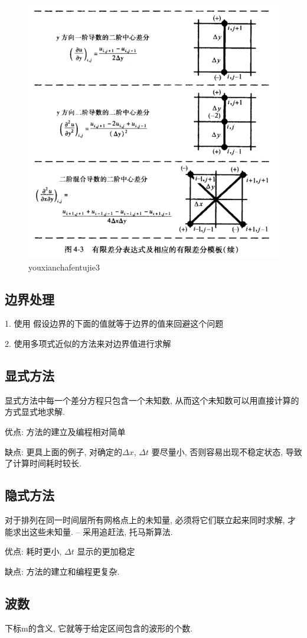 \begin{figure}
	\centering
	\includegraphics[width=0.7\linewidth]{figures/youxianchafentujie3.png}
	\caption{youxianchafentujie3}
	\label{fig:youxianchafentujie3}
\end{figure}


\subsection{边界处理}
1. 使用 假设边界的下面的值就等于边界的值来回避这个问题

2. 使用多项式近似的方法来对边界值进行求解

\subsection{显式方法}
显式方法中每一个差分方程只包含一个未知数, 从而这个未知数可以用直接计算的方式显式地求解.

优点: 方法的建立及编程相对简单

缺点: 更具上面的例子, 对确定的$\Delta  x$,  $\Delta t$ 要尽量小, 否则容易出现不稳定状态, 导致了计算时间耗时较长.
\subsection{隐式方法}
对于排列在同一时间层所有网格点上的未知量, 必须将它们联立起来同时求解, 才能求出这些未知量. -- 采用追赶法, 托马斯算法.

优点: 耗时更小, $\Delta t$ 显示的更加稳定

缺点: 方法的建立和编程更复杂.

\subsection{波数}
下标m的含义, 它就等于给定区间包含的波形的个数.


